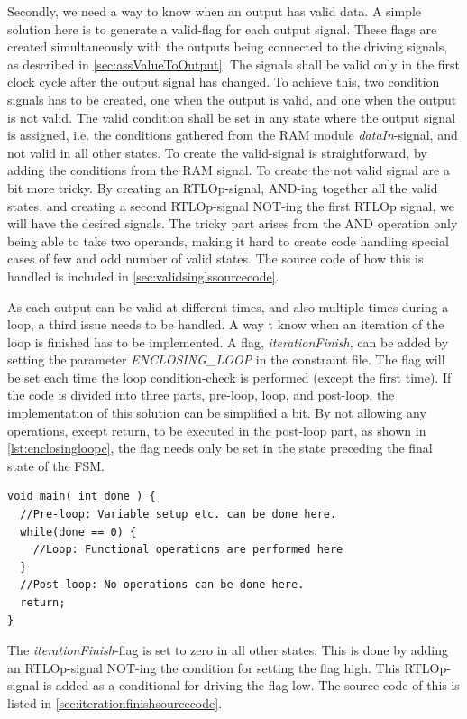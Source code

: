Secondly, we need a way to know when an output has valid data. A simple solution here is to generate a valid-flag for each output signal. These flags are created simultaneously with the outputs being connected to the driving signals, as described in \ref{sec:assValueToOutput}. The signals shall be valid only in the first clock cycle after the output signal has changed. To achieve this, two condition signals has to be created, one when the output is valid, and one when the output is not valid. The valid condition shall be set in any state where the output signal is assigned, i.e. the conditions gathered from the RAM module \textit{dataIn}-signal, and not valid in all other states. To create the valid-signal is straightforward, by adding the conditions from the RAM signal. To create the not valid signal are a bit more tricky. By creating an RTLOp-signal, AND-ing together all the valid states, and creating a second RTLOp-signal NOT-ing the first RTLOp signal, we will have the desired signals. The tricky part arises from the AND operation only being able to take two operands, making it hard to create code handling special cases of few and odd number of valid states. The source code of how this is handled is included in \cref{sec:validsinglssourcecode}.

As each output can be valid at different times, and also multiple times during a loop, a third issue needs to be handled. A way t know when an iteration of the loop is finished has to be implemented. A flag, \textit{iterationFinish}, can be added by setting the parameter \textit{ENCLOSING\_LOOP} in the constraint file. The flag will be set each time the loop condition-check is performed (except the first time). If the code is divided into three parts, pre-loop, loop, and post-loop, the implementation of this solution can be simplified a bit. By not allowing any operations, except return, to be executed in the post-loop part, as shown in \cref{lst:enclosingloopc}, the flag needs only be set in the state preceding the final state of the FSM.
\lstset{language=C,style=Cstyle}
\begin{lstlisting}[caption={Sectioning of a program with enclosing while-loop},label=lst:enclosingloopc]
void main( int done ) {
  //Pre-loop: Variable setup etc. can be done here.
  while(done == 0) {
    //Loop: Functional operations are performed here
  }
  //Post-loop: No operations can be done here.
  return;
}
\end{lstlisting}
The \textit{iterationFinish}-flag is set to zero in all other states. This is done by adding an RTLOp-signal NOT-ing the condition for setting the flag high. This RTLOp-signal is added as a conditional for driving the flag low. The source code of this is listed in \cref{sec:iterationfinishsourcecode}.

